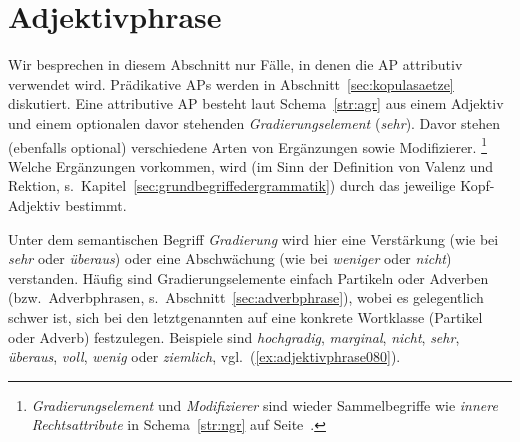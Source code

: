 \section{Adjektivphrase}
\label{sec:adjektivphrase}

Wir besprechen in diesem Abschnitt nur Fälle, in denen die AP attributiv verwendet wird.
Prädikative APs werden in Abschnitt~\ref{sec:kopulasaetze} diskutiert.
Eine attributive AP besteht laut Schema~\ref{str:agr} aus einem Adjektiv und einem optionalen davor stehenden \textit{Gradierungselement} (\zB \textit{sehr}).
Davor stehen (ebenfalls optional) verschiedene Arten von Ergänzungen sowie Modifizierer.%
\footnote{\textit{Gradierungselement} und \textit{Modifizierer} sind wieder Sammelbegriffe wie \textit{innere Rechtsattribute} in Schema~\ref{str:ngr} auf Seite~\pageref{str:ngr}.}
Welche Ergänzungen vorkommen, wird (im Sinn der Definition von Valenz und Rektion, s.\ Kapitel~\ref{sec:grundbegriffedergrammatik}) durch das jeweilige Kopf-Adjektiv bestimmt.



Unter dem semantischen Begriff \textit{Gradierung} wird hier eine Verstärkung (wie bei \textit{sehr} oder \textit{überaus}) oder eine Abschwächung (wie bei \textit{weniger} oder \textit{nicht}) verstanden.
Häufig sind Gradierungselemente einfach Partikeln oder Adverben (bzw.\ Adverbphrasen, s.\ Abschnitt~\ref{sec:adverbphrase}), wobei es gelegentlich schwer ist, sich bei den letztgenannten auf eine konkrete Wortklasse (Partikel oder Adverb) festzulegen.
Beispiele sind \textit{hochgradig}, \textit{marginal}, \textit{nicht}, \textit{sehr}, \textit{überaus}, \textit{voll}, \textit{wenig} oder \textit{ziemlich}, vgl.\ (\ref{ex:adjektivphrase080}).


\begin{exe}
  \ex\label{ex:adjektivphrase080}
  \begin{xlist}
  \end{xlist}
\end{exe}


